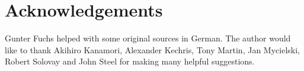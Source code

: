\documentclass{book}%
\begin{document}








\section*{Acknowledgements}

Gunter Fuchs helped with some original sources in German. The author would like to thank
Akihiro Kanamori, Alexander Kechris, Tony Martin, Jan Mycielski, Robert Solovay and John Steel for making many helpful suggestions.


%


\printindex
\end{document}
